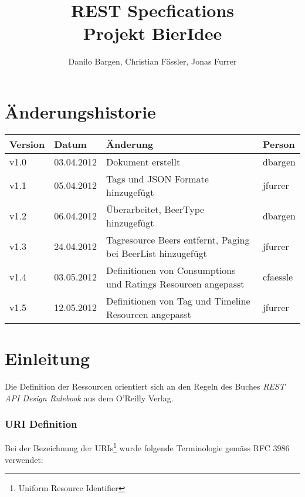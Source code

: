 \documentclass[10pt,a4paper]{scrartcl}
\author{Danilo Bargen, Christian Fässler, Jonas Furrer}
\title{REST Specfications\\Projekt BierIdee}
\begin{document}
\begin{titlepage}
	\maketitle
	\vspace{120mm}
	\thispagestyle{empty} %
\end{titlepage}

\newpage
	\tableofcontents
\newpage

\section*{Änderungshistorie}
\begin{tabular}{p{}p{}p{}p{}}
\toprule
\textbf{Version} & \textbf{Datum} & \textbf{Änderung} & \textbf{Person} \\  
\midrule
v1.0 & 03.04.2012 & Dokument erstellt & dbargen \\  
\hline 
v1.1 & 05.04.2012 & Tags und JSON Formate hinzugefügt & jfurrer \\
\hline 
v1.2 & 06.04.2012 & Überarbeitet, BeerType hinzugefügt & dbargen \\
\hline 
v1.3 & 24.04.2012 & Tagresource Beers entfernt, Paging bei BeerList hinzugefügt & jfurrer \\
\hline
v1.4 & 03.05.2012 & Definitionen von Consumptions und Ratings Resourcen angepasst & cfaessle\\
\hline
v1.5 & 12.05.2012 & Definitionen von Tag und Timeline Resourcen angepasst & jfurrer\\
\bottomrule
\end{tabular} 
\newpage


\section{Einleitung}

Die Definition der Ressourcen orientiert sich an den Regeln des Buches
\textit{REST API Design Rulebook} \cite{masse2011rest} aus dem O'Reilly Verlag.

\subsubsection*{URI Definition}

Bei der Bezeichnung der URIs\footnote{Uniform Resource Identifier} wurde folgende Terminologie gemäss RFC 3986 verwendet:
\end{document}
